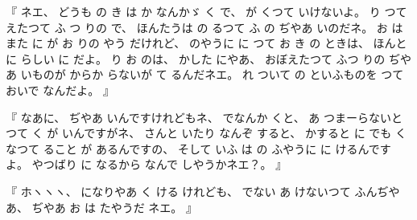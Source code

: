 %
『
ネエ、
%
どうも
の
き
は
か
なんかゞ
く
で、
%
%
が
くつて
いけないよ。
%
り
つて
えたつて%
ふ
つ
りの
で、
%
ほんたうは
の
るつて
ふ
の
ぢやあ
いのだネ。
%
お
は
また
に
が
お
りの
やう
だけれど、
%
のやうに
に
つて
お
き
の
ときは、
%
ほんとに
らしい
%
に
だよ。
%
り
お
のは、
%
かした
にやあ、
%
おぼえたつて
ふつ
りの
ぢやあ
いものが
からか
らないが
て
るんだネエ。
%
れ
ついて
の
といふものを
つて
おいで
なんだよ。
』

%
『
なあに、
%
ぢやあ
いんですけれどもネ、
%
でなんか
%
くと、
%
あ
つまーらないと
つて
く
が
いんですがネ、
%
さんと
いたり
なんぞ
すると、
%
かすると
に
でも
%
くなつて
ること
が
あるんですの、
%
そして
いふ
は
の
ふやうに
に
けるんですよ。
%
やつばり
に
なるから
なんで
しやうかネエ？。
』

%
『
ホヽヽヽ、
%
になりやあ
く
ける
けれども、
%
でない
あ
けないつて
ふんぢやあ、
%
ぢやあ
お
は
たやうだ
ネエ。
』

